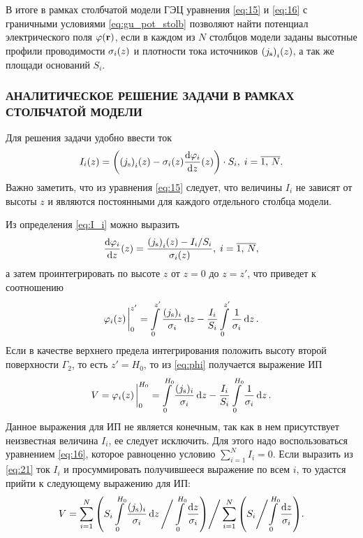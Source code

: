 В итоге в рамках столбчатой модели ГЭЦ уравнения \eqref{eq:15} и \eqref{eq:16} с граничными условиями \eqref{eq:gu_pot_stolb} позволяют найти потенциал электрического поля $\varphi(\vb{r})$, если в каждом из $N$ столбцов модели заданы высотные профили проводимости $\sigma_i\qty(z)$ и плотности тока источников $\qty(j_\mathrm{s})_i\qty(z)$, а так же площади оснований $S_i$.

\subsubsection{АНАЛИТИЧЕСКОЕ РЕШЕНИЕ ЗАДАЧИ В РАМКАХ СТОЛБЧАТОЙ МОДЕЛИ}

Для решения задачи удобно ввести ток
\begin{equation}
    I_i (z) = \qty(\qty(j_\mathrm{s})_i\qty(z) - \sigma_i(z)\dv{\varphi_i}{z}\qty(z)) \cdot S_i,\; i=\overline{1,\, N}.
    \label{eq:I_i}
\end{equation}
Важно заметить, что из уравнения \eqref{eq:15} следует, что величины $I_i$ не зависят от высоты $z$ и являются постоянными для каждого отдельного столбца модели. 

Из определения \eqref{eq:I_i} можно выразить 
\begin{equation}
    \dv{\varphi_i}{z}\qty(z) = \dfrac{\qty(j_\mathrm{s})_i\qty(z) - I_i / S_i}{\sigma_i(z)},\; i=\overline{1,\, N},
\end{equation}
а затем проинтегрировать по высоте $z$ от $z=0$ до $z=z'$, что приведет к соотношению
\begin{equation}
    \varphi_i(z)\eval_{0}^{z'} = \int\limits_{0}^{z'} \dfrac{(j_\mathrm{s})_i}{\sigma_i} \dd{z} - \dfrac{I_i}{S_i} \int\limits_{0}^{z'} \dfrac{1}{\sigma_i} \dd{z}.
    \label{eq:phi}
\end{equation}
Если в качестве верхнего предела интегрирования положить высоту второй поверхности $\Gamma_2$, то есть $z'=H_0$, то из \eqref{eq:phi} получается выражение ИП
\begin{equation}
    V = \varphi_i(z)\eval_{0}^{H_0} = \int\limits_{0}^{H_0} \dfrac{(j_\mathrm{s})_i}{\sigma_i} \dd{z} - \dfrac{I_i}{S_i} \int\limits_{0}^{H_0} \dfrac{1}{\sigma_i} \dd{z}.
    \label{eq:21}
\end{equation}
Данное выражения для ИП не является конечным, так как в нем присутствует неизвестная величина $I_i$, ее следует исключить. Для этого надо воспользоваться уравнением \eqref{eq:16}, которое равноценно условию $\sum_{i=1}^N I_i = 0$. Если выразить из \eqref{eq:21} ток $I_i$ и просуммировать получившееся выражение по всем $i$, то удастся прийти к следующему выражению для ИП:
\begin{equation}
    V = \sum\limits^N_{i=1}\qty(S_i \int\limits_0^{H_0} \dfrac{(j_\mathrm{s})_i}{\sigma_i} \dd{z} \Bigg/
    \int\limits_0^{H_0} \dfrac{\dd{z}}{\sigma_i})
    \Bigg/
    \sum\limits^N_{i=1}\qty( S_i \Bigg/ {\int\limits_0^{H_0} \dfrac{\dd{z}}{\sigma_i}}).
    \label{eq:ip_stolb}
\end{equation}

